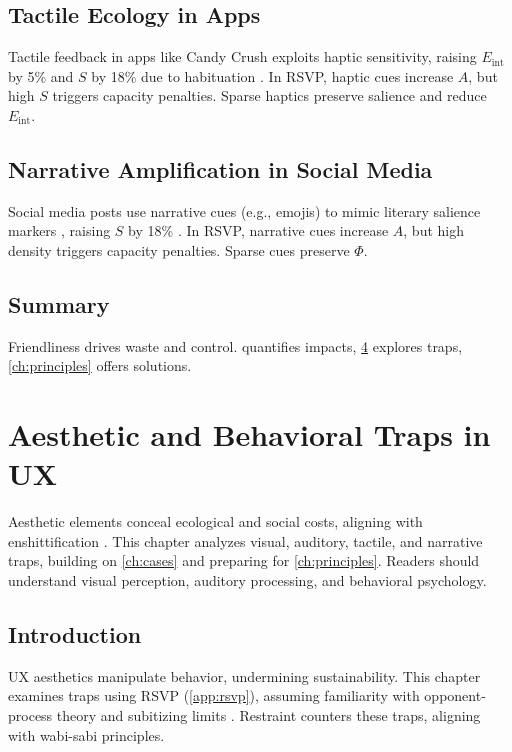 \documentclass[openany]{book}
\newcommand{\PhiS}{\Phi} %
\newcommand{\Sent}{S} %
\newcommand{\Eint}{E_{\mathrm{int}}} %
\begin{document}
\section{Tactile Ecology in Apps}
\label{sec:cases-tactile}
Tactile feedback in apps like Candy Crush exploits haptic sensitivity, raising \(\Eint\) by 5\% and \(\Sent\) by 18\% due to habituation \citep{gallace2006}. In RSVP, haptic cues increase \(A\), but high \(\Sent\) triggers capacity penalties. Sparse haptics preserve salience and reduce \(\Eint\).

\section{Narrative Amplification in Social Media}
\label{sec:cases-narrative}
Social media posts use narrative cues (e.g., emojis) to mimic literary salience markers \citep{lewis1942}, raising \(\Sent\) by 18\% \citep{colak2024}. In RSVP, narrative cues increase \(A\), but high density triggers capacity penalties. Sparse cues preserve \(\PhiS\).

\section{Summary}
Friendliness drives waste and control.  quantifies impacts, \cref{ch:aesthetic} explores traps, \cref{ch:principles} offers solutions.

\chapter{Aesthetic and Behavioral Traps in UX}
\label{ch:aesthetic}

Aesthetic elements conceal ecological and social costs, aligning with enshittification \citep{doctorow2022}. This chapter analyzes visual, auditory, tactile, and narrative traps, building on \cref{ch:cases} and preparing for \cref{ch:principles}. Readers should understand visual perception, auditory processing, and behavioral psychology.

\section{Introduction}
\label{sec:aesthetic-intro}
UX aesthetics manipulate behavior, undermining sustainability. This chapter examines traps using RSVP (\cref{app:rsvp}), assuming familiarity with opponent-process theory \citep{hurvich1981} and subitizing limits \citep{kaufman1949}. Restraint counters these traps, aligning with wabi-sabi principles.
\end{document}
